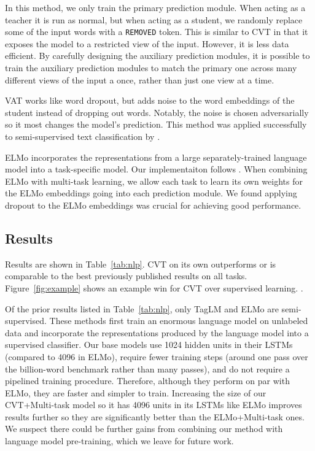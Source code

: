 \documentclass[11pt,a4paper]{article}
\newcommand{\xhdr}[1]{\vspace{1.7mm}\noindent{{\bf #1.}}}
\begin{document}
\xhdr{Word Dropout} In this method, we only train the primary prediction module. When acting as a teacher it is run as normal, but when acting as a student, we  randomly replace some of the input words with a \texttt{REMOVED} token. This is similar to CVT in that it exposes the model to a restricted view of the input. However, it is less data efficient. By carefully designing the auxiliary prediction modules, it is possible to train the auxiliary prediction modules to match the primary one across many different views of the input a once, rather than just one view at a time.

\xhdr{Virtual Adversarial Training (VAT)} 
VAT \citep{miyato2015distributional} works like word dropout, but adds noise to the word embeddings of the student instead of dropping out words. Notably, the noise is chosen adversarially so it most changes the model's prediction. This method was applied successfully to semi-supervised text classification by \citet{miyato2016adversarial}. 
 
 \xhdr{ELMo} ELMo incorporates the representations from a large separately-trained language model into a task-specific model. Our implementaiton follows \citet{peters2018deep}. 
 When combining ELMo with multi-task learning, we allow each task to learn its own weights for the ELMo embeddings going into each prediction module. We found applying dropout to the ELMo embeddings was crucial for achieving good performance. 
 
 



\subsection{Results}

Results are shown in Table~\ref{tab:nlp}. 
CVT on its own outperforms or is comparable to the best previously published results on all tasks.
Figure~\ref{fig:example} shows an example win for CVT over supervised learning. .

Of the prior results listed in Table~\ref{tab:nlp}, only TagLM and ELMo are semi-supervised. These methods first train an enormous language model on unlabeled data and incorporate the representations produced by the language model into a supervised classifier.
Our base models use 1024 hidden units in their LSTMs (compared to 4096 in ELMo), require fewer training steps (around one pass over the billion-word benchmark rather than many passes), and do not require a pipelined training procedure.
Therefore, although they perform on par with ELMo, they are faster and simpler to train.
Increasing the size of our CVT+Multi-task model so it has 4096 units in its LSTMs like ELMo improves results further so they are significantly better than the ELMo+Multi-task ones.
We suspect there could be further gains from combining our method with language model pre-training, which we leave for future work.
\end{document}
